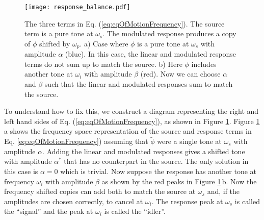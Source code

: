 \begin{figure}
\begin{centering}
\texttt{[image: response\_balance.pdf]} 
\par\end{centering}
\caption{The three terms in Eq. (\ref{eq:eqOfMotionFrequency}).
The source term is a pure tone at $\omega_s$.
The modulated response produces a copy of $\phi$ shifted by $\omega_p$.
a) Case where $\phi$ is a pure tone at $\omega_s$ with amplitude $\alpha$ (blue).
In this case, the linear and modulated response terms do not sum up to match the source.
b) Here $\phi$ includes another tone at $\omega_i$ with amplitude $\beta$ (red).
Now we can choose $\alpha$ and $\beta$ such that the linear and modulated responses sum to match the source.}
\label{Fig:responseBalance}
\end{figure}

To understand how to fix this, we construct a diagram representing the right and left hand sides of Eq. (\ref{eq:eqOfMotionFrequency}), as shown in Figure \ref{Fig:responseBalance}.
Figure \ref{Fig:responseBalance}\,a shows the frequency space representation of the source and response terms in Eq. \ref{eq:eqOfMotionFrequency}) assuming that $\tilde\phi$ were a single tone at $\omega_s$ with amplitude $\alpha$.
Adding the linear and modulated responses gives a shifted tone with amplitude $\alpha^*$ that has no counterpart in the source.
The only solution in this case is $\alpha=0$ which is trivial.
Now suppose the response has another tone at frequency $\omega_i$ with amplitude $\beta$ as shown by the red peaks in Figure \ref{Fig:responseBalance}\,b.
Now the frequency shifted copies can add both to match the source at $\omega_s$ and, if the amplitudes are chosen correctly, to cancel at $\omega_i$.
The response peak at $\omega_s$ is called the ``signal'' and the peak at $\omega_i$ is called the ``idler''.

